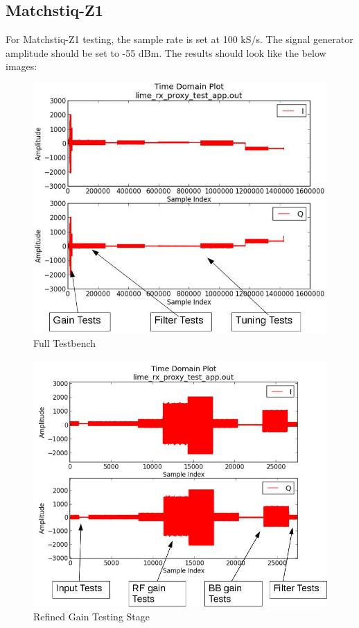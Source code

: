 \documentclass{article}
\begin{document}
\subsection*{Matchstiq-Z1}
For Matchstiq-Z1 testing, the sample rate is set at 100 kS/s. The signal generator amplitude should be set to -55 dBm.
The results should look like the below images:
\begin{figure}[H]
	\centerline{\includegraphics[scale=0.5]{lime_RX_big_testbench}}
	\caption{Full Testbench}
\end{figure}
\begin{figure}[H]
	\centerline{\includegraphics[scale=0.5]{lime_RX_small_testbench}}
	\caption{Refined Gain Testing Stage}
\end{figure}
\end{document}
